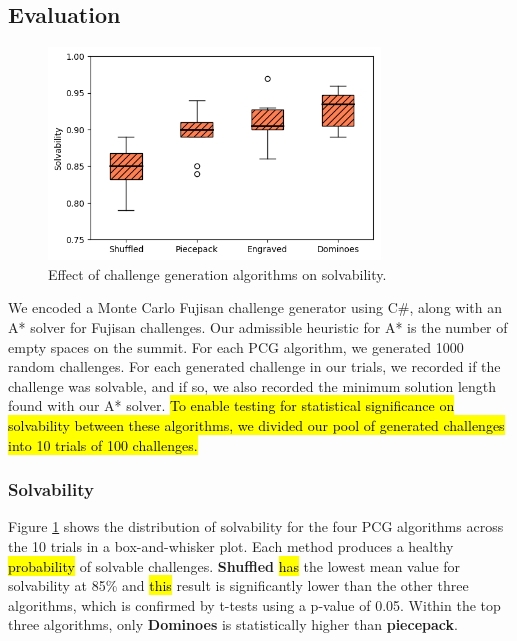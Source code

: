 \documentclass[journal]{IEEEtran}
\begin{document}
\subsection{Evaluation}

 \noindent


\begin{figure}[t]
\includegraphics[width=8.8cm]{standalonesolve2.png}
\caption{Effect of challenge generation algorithms on solvability.}
\label{fig:strategycomp}
\end{figure}

We encoded a Monte Carlo Fujisan challenge generator using C\#, along with an A* solver for Fujisan challenges. Our admissible heuristic for A* is the number of empty spaces on the summit. For each PCG algorithm, we generated 1000 random challenges.
For each generated challenge in our trials, we recorded if the challenge was solvable, and if so, we also recorded the minimum solution length found with our A* solver. \hl{To enable testing for statistical significance on solvability between these algorithms, we divided our pool of generated challenges into 10 trials of 100 challenges. }
 
\subsubsection{Solvability}

Figure \ref{fig:strategycomp} shows the distribution of solvability for the four PCG algorithms across the 10 trials in a box-and-whisker plot. Each method produces a healthy \hl{probability} of solvable challenges. {\bf Shuffled} \hl{has} the lowest mean value for solvability at 85\% and \hl{this} result is significantly lower than the other three algorithms, which is confirmed by t-tests using a p-value of 0.05. Within the top three algorithms, only {\bf Dominoes} is statistically higher than {\bf piecepack}. 
\end{document}
